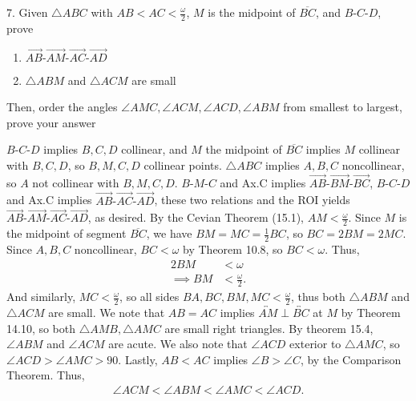 \documentclass{report}
\begin{document}
    \bigbreak \noindent 
    \begin{mdframed}
        7. Given $\triangle ABC$ with $AB < AC < \frac{\omega}{2}$, $M$ is the midpoint of $\overline{BC}$, and $  B\text{-}C\text{-}D$, prove 
        \begin{enumerate}[label=(\alph*)]
            \item $\overrightarrow{AB}\text{-}\overrightarrow{AM}\text{-}\overrightarrow{AC}\text{-}\overrightarrow{AD} $
            \item $\triangle ABM$ and $\triangle ACM$ are small
        \end{enumerate}
        Then, order the angles $\angle AMC, \angle ACM, \angle ACD, \angle ABM$ from smallest to largest, prove your answer
    \end{mdframed}
    \bigbreak \noindent 
    $ B\text{-}C\text{-}D$ implies $ B,C,D$ collinear, and $M$ the midpoint of $\overline{BC}$ implies $ M$ collinear with $B,C,D$, so $ B,M,C,D$ collinear points. $\triangle ABC$ implies $ A,B,C$ noncollinear, so $A$ not collinear with $B,M,C,D$.
    \bigbreak \noindent 
    $ B\text{-}M\text{-}C$ and Ax.C implies $ \overrightarrow{AB}\text{-}\overrightarrow{BM}\text{-}\overrightarrow{BC}$, $ B\text{-}C\text{-}D $ and Ax.C implies $ \overrightarrow{AB}\text{-}\overrightarrow{AC}\text{-}\overrightarrow{AD}$, these two relations and the ROI yields $ \overrightarrow{AB}\text{-}\overrightarrow{AM}\text{-}\overrightarrow{AC}\text{-}\overrightarrow{AD}$, as desired.
    \bigbreak \noindent 
    By the Cevian Theorem (15.1), $ AM < \frac{\omega}{2}$. Since $M$ is the midpoint of segment $ \overline{BC}$, we have $BM = MC = \frac{1}{2}BC$, so $ BC = 2BM = 2MC$. Since $ A,B,C$ noncollinear, $BC < \omega$ by Theorem 10.8, so $ BC < \omega$. Thus,
    \begin{align*}
        2BM &< \omega \\
        \implies BM &< \frac{\omega}{2}
    .\end{align*}
    And similarly, $MC <\frac{\omega}{2}$, so all sides $BA,BC,BM,MC < \frac{\omega}{2}$, thus both $\triangle ABM$ and $ \triangle ACM$ are small.
    \bigbreak \noindent 
    We note that $AB = AC$ implies $\overleftrightarrow{AM} \perp \overleftrightarrow{BC}$ at $M$ by Theorem 14.10, so both $\triangle AMB, \triangle AMC$ are small right triangles. By theorem 15.4, $ \angle ABM$ and $ \angle ACM $ are acute.
    \bigbreak \noindent 
    We also note that $\angle ACD$ exterior to $\triangle AMC$, so $\angle ACD > \angle AMC > 90$. Lastly, $ AB < AC$ implies $ \angle B > \angle C$, by the Comparison Theorem. Thus,
    \begin{align*}
        \angle ACM < \angle ABM < \angle AMC < \angle ACD
    .\end{align*}
\end{document}
